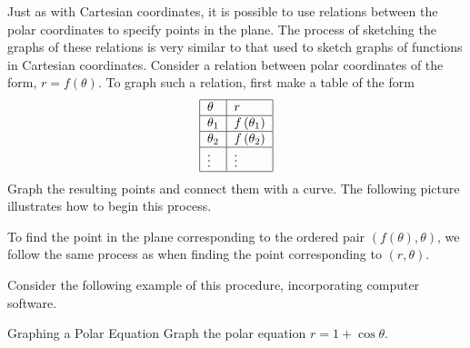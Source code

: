 Just as with Cartesian coordinates, it is possible to use
relations between the polar coordinates to specify points in the plane. The
process of sketching the graphs of these relations is very similar to that used to sketch
graphs of functions in Cartesian coordinates. Consider a relation between polar coordinates of the form, $r=f\left( \theta \right)$. To graph such a relation, first make a table of
the form 
\begin{equation*}
\begin{tabular}{|l|l|}
\hline
$\theta $ & $r$ \\ \hline
$\theta _{1}$ & $f\left( \theta _{1}\right) $ \\ \hline
$\theta _{2}$ & $f\left( \theta _{2}\right) $ \\ \hline
$\vdots $ & $\vdots $ \\ \hline
\end{tabular}
\end{equation*}
Graph the resulting points and connect them with a curve. The
following picture illustrates how to begin this process.

\begin{center}
\end{center}

To find the point in the plane corresponding to the ordered pair $\left( f\left(
\theta \right) ,\theta \right) $, we follow the same process as when finding the point corresponding to $\left( r, \theta \right)$.

Consider the following example of this procedure, incorporating computer software.

\begin{example}{Graphing a Polar Equation}
Graph the polar equation $r=1+\cos \theta$.
\end{example}

